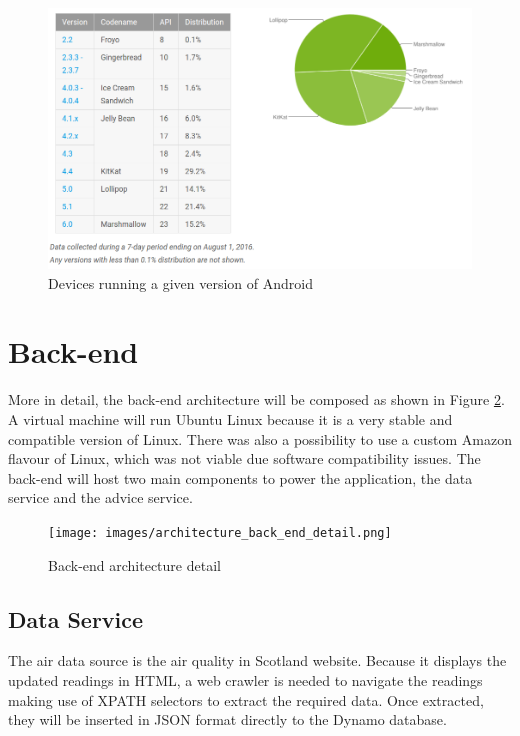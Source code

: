 \begin{figure}[H]
\begin{adjustbox}{width=1\textwidth,center=\textwidth}
  \centering
  \includegraphics[scale=1]{images/android_platform_versions.png}
\end{adjustbox}
  \caption[Devices running a given version of Android]{Devices running a given version of Android \footnotemark}
  \label{fig:android_platform_versions}
\end{figure}

\section{Back-end}
More in detail, the back-end architecture will be composed as shown in Figure \ref{fig:architecture_back_end_detail}. A virtual machine will run Ubuntu Linux because it is a very stable and compatible version of Linux. There was also a possibility to use a custom Amazon flavour of Linux, which was not viable due software compatibility issues. The back-end will host two main components to power the application, the data service and the advice service. 

\begin{figure}[H]
\begin{adjustbox}{width=.6\textwidth,center=\textwidth}
  \centering
  \texttt{[image: images/architecture\_back\_end\_detail.png]}
\end{adjustbox}
  \caption[Back-end architecture]{Back-end architecture detail}
  \label{fig:architecture_back_end_detail}
\end{figure}


\subsection{Data Service}
 The air data source is the air quality in Scotland website. Because it displays the updated readings in HTML, a web crawler is needed to navigate the readings making use of XPATH selectors to extract the required data. Once extracted, they will be inserted in JSON format directly to the Dynamo database.
 
